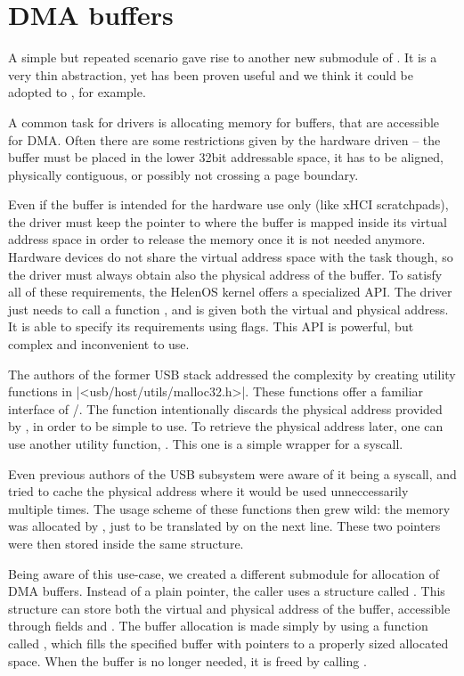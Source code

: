 \section{DMA buffers}

A simple but repeated scenario gave rise to another new submodule of
. It is a very thin abstraction, yet has been proven useful and we
think it could be adopted to , for example.

A common task for drivers is allocating memory for buffers, that are accessible
for DMA. Often there are some restrictions given by the hardware driven -- the
buffer must be placed in the lower 32bit addressable space, it has to be
aligned, physically contiguous, or possibly not crossing a page boundary.

Even if the buffer is intended for the hardware use only (like xHCI
scratchpads), the driver must keep the pointer to where the buffer is mapped
inside its virtual address space in order to release the memory once it is not
needed anymore. Hardware devices do not share the virtual address space with
the task though, so the driver must always obtain also the physical address of
the buffer. To satisfy all of these requirements, the HelenOS kernel offers
a specialized API. The driver just needs to call a function
, and is given both the virtual and physical address. It
is able to specify its requirements using flags. This API is powerful, but
complex and inconvenient to use.

The authors of the former USB stack addressed the complexity by creating
utility functions in \header|<usb/host/utils/malloc32.h>|. These functions offer
a familiar interface of /. The  function
intentionally discards the physical address provided by
, in order to be simple to use. To retrieve the physical
address later, one can use another utility function, . This
one is a simple wrapper for a syscall.

Even previous authors of the USB subsystem were aware of it being a syscall,
and tried to cache the physical address where it would be used unneccessarily
multiple times. The usage scheme of these functions then grew wild: the memory
was allocated by , just to be translated by  on
the next line. These two pointers were then stored inside the same structure.

Being aware of this use-case, we created a different submodule for allocation
of DMA buffers. Instead of a plain pointer, the caller uses a structure called
. This structure can store both the virtual and physical
address of the buffer, accessible through fields  and
. The buffer allocation is made simply by using a function called
, which fills the specified buffer with pointers to
a properly sized allocated space. When the buffer is no longer needed, it is
freed by calling .

